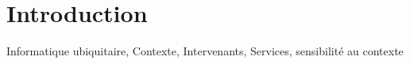 \chapter{Introduction}
Informatique ubiquitaire, Contexte, Intervenants, Services, sensibilité au contexte